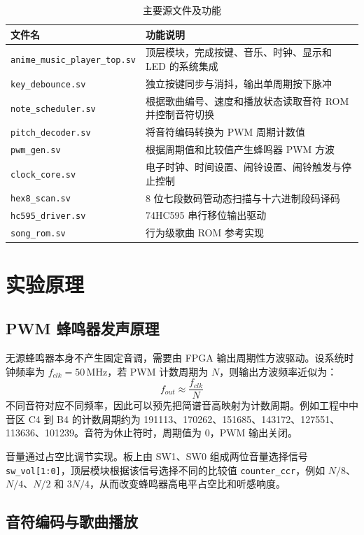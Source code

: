 \documentclass[UTF8,a4paper,12pt]{ctexart}
\begin{document}
\begin{table}[H]
  \centering
  \caption{主要源文件及功能}
  \begin{tabular}{ll}
    \toprule
    文件名 & 功能说明 \\
    \midrule
    \verb|anime_music_player_top.sv| & 顶层模块，完成按键、音乐、时钟、显示和 LED 的系统集成 \\
    \verb|key_debounce.sv| & 独立按键同步与消抖，输出单周期按下脉冲 \\
    \verb|note_scheduler.sv| & 根据歌曲编号、速度和播放状态读取音符 ROM 并控制音符切换 \\
    \verb|pitch_decoder.sv| & 将音符编码转换为 PWM 周期计数值 \\
    \verb|pwm_gen.sv| & 根据周期值和比较值产生蜂鸣器 PWM 方波 \\
    \verb|clock_core.sv| & 电子时钟、时间设置、闹铃设置、闹铃触发与停止控制 \\
    \verb|hex8_scan.sv| & 8 位七段数码管动态扫描与十六进制段码译码 \\
    \verb|hc595_driver.sv| & 74HC595 串行移位输出驱动 \\
    \verb|song_rom.sv| & 行为级歌曲 ROM 参考实现 \\
    \bottomrule
  \end{tabular}
\end{table}

\section{实验原理}

\subsection{PWM 蜂鸣器发声原理}

无源蜂鸣器本身不产生固定音调，需要由 FPGA 输出周期性方波驱动。设系统时钟频率为 $f_{clk}=50\,\text{MHz}$，若 PWM 计数周期为 $N$，则输出方波频率近似为：
\[
f_{out} \approx \frac{f_{clk}}{N}
\]
不同音符对应不同频率，因此可以预先把简谱音高映射为计数周期。例如工程中中音区 C4 到 B4 的计数周期约为 191113、170262、151685、143172、127551、113636、101239。音符为休止符时，周期值为 0，PWM 输出关闭。

音量通过占空比调节实现。板上由 SW1、SW0 组成两位音量选择信号 \verb|sw_vol[1:0]|，顶层模块根据该信号选择不同的比较值 \verb|counter_ccr|，例如 $N/8$、$N/4$、$N/2$ 和 $3N/4$，从而改变蜂鸣器高电平占空比和听感响度。

\subsection{音符编码与歌曲播放}
\end{document}
